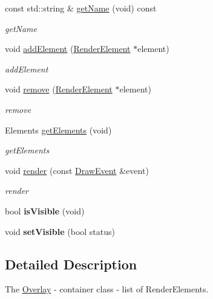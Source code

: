 \begin{DoxyCompactItemize}
\item 
const std\+::string \& \hyperlink{classEngine_1_1Overlay_a2811875f49a01ed373273f05923a967c}{get\+Name} (void) const 
\begin{DoxyCompactList}\small\item\em get\+Name \end{DoxyCompactList}\item 
void \hyperlink{classEngine_1_1Overlay_a543a6ebad7a8e14f9950bb3ce5e2375c}{add\+Element} (\hyperlink{classEngine_1_1RenderElement}{Render\+Element} $\ast$element)
\begin{DoxyCompactList}\small\item\em add\+Element \end{DoxyCompactList}\item 
void \hyperlink{classEngine_1_1Overlay_a65ac966bde65f657f361f080ecb9a6cb}{remove} (\hyperlink{classEngine_1_1RenderElement}{Render\+Element} $\ast$element)
\begin{DoxyCompactList}\small\item\em remove \end{DoxyCompactList}\item 
Elements \hyperlink{classEngine_1_1Overlay_a3b59be62922ee7c3ec7b41a98326802c}{get\+Elements} (void)
\begin{DoxyCompactList}\small\item\em get\+Elements \end{DoxyCompactList}\item 
void \hyperlink{classEngine_1_1Overlay_ae06d70a5d7e885df7bb59996e162a70f}{render} (const \hyperlink{classEngine_1_1DrawEvent}{Draw\+Event} \&event)
\begin{DoxyCompactList}\small\item\em render \end{DoxyCompactList}\item 
\hypertarget{classEngine_1_1Overlay_a494f4baa38d9d044bac190e94e5d0cbb}{}bool {\bfseries is\+Visible} (void)\label{classEngine_1_1Overlay_a494f4baa38d9d044bac190e94e5d0cbb}

\item 
\hypertarget{classEngine_1_1Overlay_ae2826553d74a1884bcdfbcd1a108002c}{}void {\bfseries set\+Visible} (bool status)\label{classEngine_1_1Overlay_ae2826553d74a1884bcdfbcd1a108002c}

\end{DoxyCompactItemize}


\subsection{Detailed Description}
The \hyperlink{classEngine_1_1Overlay}{Overlay} -\/ container class -\/ list of Render\+Elements. 

